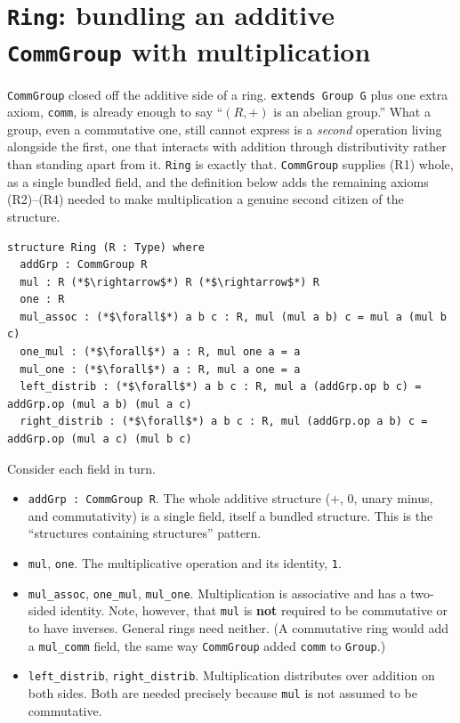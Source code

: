 \section{\texorpdfstring{\texttt{Ring}: bundling an additive \texttt{CommGroup} with multiplication}{Ring: bundling an additive CommGroup with multiplication}}\label{sec:09-rings:03-ring:1}

\texttt{CommGroup} closed off the additive side of a ring. \texttt{extends Group G} plus one extra axiom, \texttt{comm}, is already enough to say ``\((R, +)\) is an abelian group.'' What a group, even a commutative one, still cannot express is a \emph{second} operation living alongside the first, one that interacts with addition through distributivity rather than standing apart from it. \texttt{Ring} is exactly that. \texttt{CommGroup} supplies (R1) whole, as a single bundled field, and the definition below adds the remaining axioms (R2)--(R4) needed to make multiplication a genuine second citizen of the structure.

\begin{lstlisting}
structure Ring (R : Type) where
  addGrp : CommGroup R
  mul : R (*$\rightarrow$*) R (*$\rightarrow$*) R
  one : R
  mul_assoc : (*$\forall$*) a b c : R, mul (mul a b) c = mul a (mul b c)
  one_mul : (*$\forall$*) a : R, mul one a = a
  mul_one : (*$\forall$*) a : R, mul a one = a
  left_distrib : (*$\forall$*) a b c : R, mul a (addGrp.op b c) = addGrp.op (mul a b) (mul a c)
  right_distrib : (*$\forall$*) a b c : R, mul (addGrp.op a b) c = addGrp.op (mul a c) (mul b c)
\end{lstlisting}

Consider each field in turn.

\begin{itemize}
\tightlist
\item
  \texttt{addGrp : CommGroup R}. The whole additive structure (\(+\), \(0\), unary minus, and commutativity) is a single field, itself a bundled structure. This is the ``structures containing structures'' pattern.
\item
  \texttt{mul}, \texttt{one}. The multiplicative operation and its identity, \texttt{1}.
\item
  \texttt{mul\_\allowbreak{}assoc}, \texttt{one\_\allowbreak{}mul}, \texttt{mul\_\allowbreak{}one}. Multiplication is associative and has a two-sided identity. Note, however, that \texttt{mul} is \textbf{not} required to be commutative or to have inverses. General rings need neither. (A commutative ring would add a \texttt{mul\_\allowbreak{}comm} field, the same way \texttt{CommGroup} added \texttt{comm} to \texttt{Group}.)
\item
  \texttt{left\_\allowbreak{}distrib}, \texttt{right\_\allowbreak{}distrib}. Multiplication distributes over addition on both sides. Both are needed precisely because \texttt{mul} is not assumed to be commutative.
\end{itemize}

